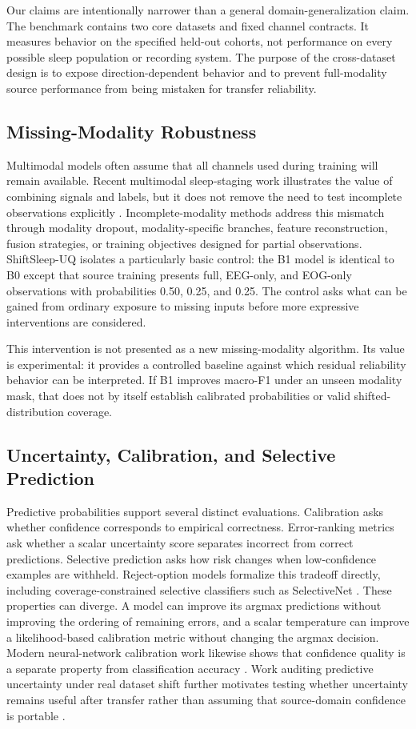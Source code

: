\documentclass[10pt,twocolumn]{article}
\begin{document}
Our claims are intentionally narrower than a general domain-generalization claim. The benchmark contains two core datasets and fixed channel contracts. It measures behavior on the specified held-out cohorts, not performance on every possible sleep population or recording system. The purpose of the cross-dataset design is to expose direction-dependent behavior and to prevent full-modality source performance from being mistaken for transfer reliability.

\subsection{Missing-Modality Robustness}
Multimodal models often assume that all channels used during training will remain available. Recent multimodal sleep-staging work illustrates the value of combining signals and labels, but it does not remove the need to test incomplete observations explicitly \citep{yang2023sleepclip}. Incomplete-modality methods address this mismatch through modality dropout, modality-specific branches, feature reconstruction, fusion strategies, or training objectives designed for partial observations. ShiftSleep-UQ isolates a particularly basic control: the B1 model is identical to B0 except that source training presents full, EEG-only, and EOG-only observations with probabilities 0.50, 0.25, and 0.25. The control asks what can be gained from ordinary exposure to missing inputs before more expressive interventions are considered.

This intervention is not presented as a new missing-modality algorithm. Its value is experimental: it provides a controlled baseline against which residual reliability behavior can be interpreted. If B1 improves macro-F1 under an unseen modality mask, that does not by itself establish calibrated probabilities or valid shifted-distribution coverage.

\subsection{Uncertainty, Calibration, and Selective Prediction}
Predictive probabilities support several distinct evaluations. Calibration asks whether confidence corresponds to empirical correctness. Error-ranking metrics ask whether a scalar uncertainty score separates incorrect from correct predictions. Selective prediction asks how risk changes when low-confidence examples are withheld. Reject-option models formalize this tradeoff directly, including coverage-constrained selective classifiers such as SelectiveNet \citep{geifman2019selectivenet}. These properties can diverge. A model can improve its argmax predictions without improving the ordering of remaining errors, and a scalar temperature can improve a likelihood-based calibration metric without changing the argmax decision. Modern neural-network calibration work likewise shows that confidence quality is a separate property from classification accuracy \citep{guo2017calibration}. Work auditing predictive uncertainty under real dataset shift further motivates testing whether uncertainty remains useful after transfer rather than assuming that source-domain confidence is portable \citep{thagaard2020uncertaintyshift,prinster2022jaws}.
\end{document}

